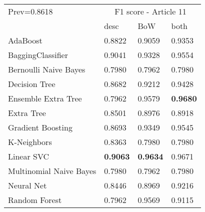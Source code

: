 \begin{tabular}{|l|l|l|l| }
\hline
Prev=0.8618 &  \multicolumn{3}{c|}{F1 score - Article 11} \\
\cline{2-4} & desc & BoW & both \\ \hline
AdaBoost                & 0.8822 & 0.9059 & 0.9353\\
BaggingClassifier       & 0.9041 & 0.9328 & 0.9554\\
Bernoulli Naive Bayes   & 0.7980 & 0.7962 & 0.7980\\
Decision Tree           & 0.8682 & 0.9212 & 0.9428\\
Ensemble Extra Tree     & 0.7962 & 0.9579 & {\bf 0.9680}\\
Extra Tree              & 0.8501 & 0.8976 & 0.8918\\
Gradient Boosting       & 0.8693 & 0.9349 & 0.9545\\
K-Neighbors             & 0.8363 & 0.7980 & 0.7980\\
Linear SVC              & {\bf 0.9063} & {\bf 0.9634} & 0.9671\\
Multinomial Naive Bayes & 0.7980 & 0.7962 & 0.7980\\
Neural Net              & 0.8446 & 0.8969 & 0.9216\\
Random Forest           & 0.7962 & 0.9569 & 0.9115\\
\hline
\end{tabular}